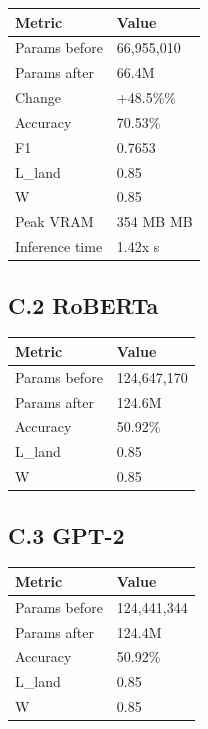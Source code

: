 \begin{table}[H]
\centering
\small
\begin{tabular}{ll}
\toprule
\textbf{Metric} & \textbf{Value} \\
\midrule
Params before & 66,955,010 \\
Params after & 66.4M \\
Change & +48.5\%\% \\
Accuracy & 70.53\% \\
F1 & 0.7653 \\
L\_land & 0.85 \\
W & 0.85 \\
Peak VRAM & 354 MB MB \\
Inference time & 1.42x s \\
\bottomrule
\end{tabular}
\end{table}

\subsection{C.2 RoBERTa}

\begin{table}[H]
\centering
\small
\begin{tabular}{ll}
\toprule
\textbf{Metric} & \textbf{Value} \\
\midrule
Params before & 124,647,170 \\
Params after & 124.6M \\
Accuracy & 50.92\% \\
L\_land & 0.85 \\
W & 0.85 \\
\bottomrule
\end{tabular}
\end{table}

\subsection{C.3 GPT-2}

\begin{table}[H]
\centering
\small
\begin{tabular}{ll}
\toprule
\textbf{Metric} & \textbf{Value} \\
\midrule
Params before & 124,441,344 \\
Params after & 124.4M \\
Accuracy & 50.92\% \\
L\_land & 0.85 \\
W & 0.85 \\
\bottomrule
\end{tabular}
\end{table}

